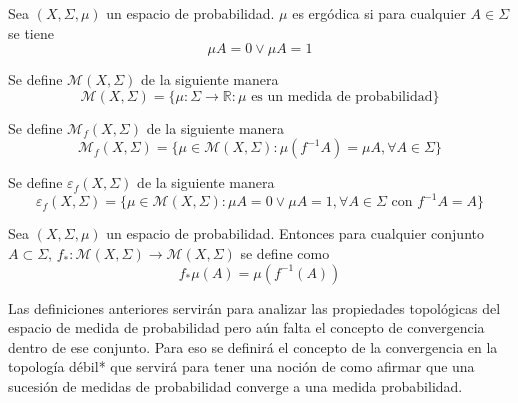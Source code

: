 \begin{definicion}
	Sea $(X,\Sigma,\mu)$ un espacio de probabilidad. $\mu$ es ergódica si para cualquier $A \in \Sigma$ se tiene	
	\begin{equation}
		\mu A = 0 \vee \mu A = 1
	\end{equation}
\end{definicion}

\begin{definicion}
	Se define $\mathcal{M}(X,\Sigma)$ de la siguiente manera	
	\begin{equation}
		\mathcal{M}(X,\Sigma) = \{\mu: \Sigma \rightarrow \mathbb{R}: \mu \text{ es un medida de probabilidad} \}
	\end{equation}
\end{definicion}

\begin{definicion}
	Se define $\mathcal{M}_f(X,\Sigma)$ de la siguiente manera	
	\begin{equation}
		\mathcal{M}_f(X,\Sigma) = \{ \mu \in \mathcal{M}(X,\Sigma): \mu(f^{-1} A) = \mu A, \forall A \in \Sigma \}
	\end{equation}
\end{definicion}

\begin{definicion}
	Se define $\varepsilon_f(X,\Sigma)$ de la siguiente manera	
	\begin{equation}
		\varepsilon_f(X,\Sigma) = \{ \mu \in \mathcal{M}(X,\Sigma): \mu A = 0 \vee \mu A = 1, \forall A \in \Sigma \text{ con } f^{-1}A = A  \}
	\end{equation}
\end{definicion}

\begin{definicion}
	Sea $(X,\Sigma,\mu)$ un espacio de probabilidad. Entonces para cualquier conjunto $A \subset \Sigma$, $f_*: \mathcal{M}(X,\Sigma) \rightarrow \mathcal{M}(X,\Sigma)$ se define como	
	\begin{equation}
		f_*\mu(A) = \mu(f^{-1}(A))
	\end{equation}
\end{definicion}

Las definiciones anteriores servirán para analizar las propiedades topológicas del espacio de medida de probabilidad pero aún falta el concepto de convergencia dentro de ese conjunto. Para eso se definirá el concepto de la convergencia en la topología débil* que servirá para tener una noción de como afirmar que una sucesión de medidas de probabilidad converge a una medida probabilidad.

